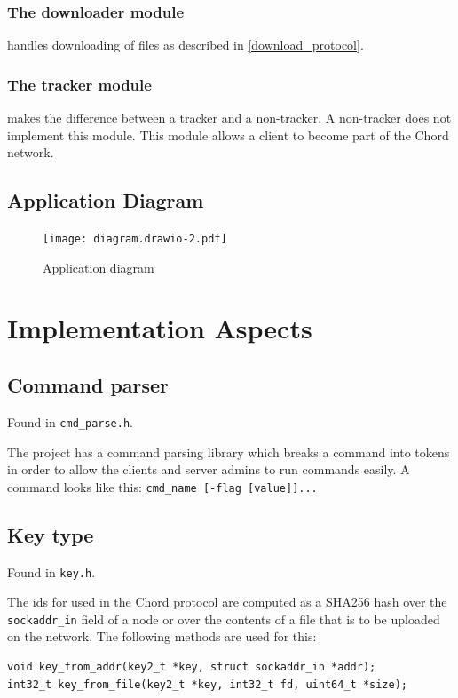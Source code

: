 \documentclass[runningheads]{llncs}
\begin{document}
\subsubsection{The downloader module}
handles downloading of files as described in \ref{download_protocol}.
\subsubsection{The tracker module}
makes the difference between a tracker and a non-tracker. A non-tracker does not implement this module. This module allows a client to become part of the Chord network.

\subsection{Application Diagram} \label{app_diagram}
\begin{figure}
\texttt{[image: diagram.drawio-2.pdf]}
\caption{Application diagram} \label{app_diagram_fig}
\end{figure}

\pagebreak

\section{Implementation Aspects} \label{implementation}
\subsection{Command parser}
Found in \verb|cmd_parse.h|.

The project has a command parsing library which breaks a command into tokens in order to allow the clients and server admins to run commands easily. A command looks like this: \verb|cmd_name [-flag [value]]...|

\subsection{Key type} \label{key2_t}
Found in \verb|key.h|.

The ids for used in the Chord protocol are computed as a SHA256 hash \cite{ref_url1} over the \verb|sockaddr_in| field of a node or over the contents of a file that is to be uploaded on the network. The following methods are used for this:
\begin{lstlisting}
void key_from_addr(key2_t *key, struct sockaddr_in *addr);
int32_t key_from_file(key2_t *key, int32_t fd, uint64_t *size);
\end{lstlisting}
\end{document}
